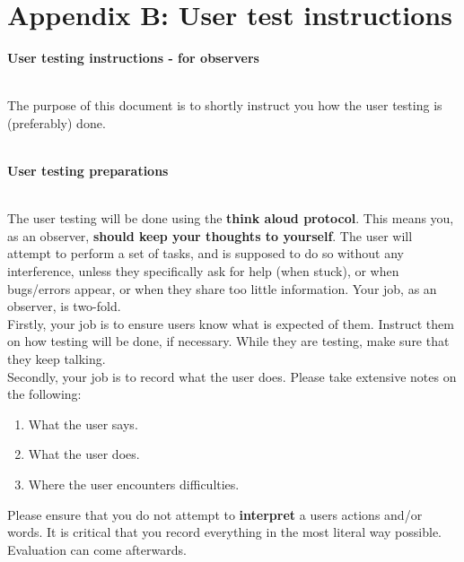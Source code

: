 \section*{Appendix B: User test instructions}
\begin{Large}
\textbf{User testing instructions - for observers}\\\\
\end{Large}
The purpose of this document is to shortly instruct you how the user testing is (preferably) done.\\\\
\begin{large}
\textbf{User testing preparations}\\\\
\end{large}
The user testing will be done using the \textbf{think aloud protocol}. This means you, as an observer, \textbf{should keep your thoughts to yourself}. The user will attempt to perform a set of tasks, and is supposed to do so without any interference, unless they specifically ask for help (when stuck), or when bugs/errors appear, or when they share too little information. Your job, as an observer, is two-fold.\\
Firstly, your job is to ensure users know what is expected of them. Instruct them on how testing will be done, if necessary. While they are testing, make sure that they keep talking.\\
Secondly, your job is to record what the user does. Please take extensive notes on the following:\\
\begin{enumerate}
\item What the user says.
\item What the user does.
\item Where the user encounters difficulties.
\end{enumerate}
Please ensure that you do not attempt to \textbf{interpret} a user\textquotesingle s actions and/or words. It is critical that you record everything in the most literal way possible. Evaluation can come afterwards.
\newpage

